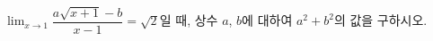 $\displaystyle\lim_{x\to 1} \dfrac{a\sqrt{x+1}-b}{x-1}=\sqrt{2}$일 때, 상수 $a$, $b$에 대하여 $a^2+b^2$의 값을 구하시오.
